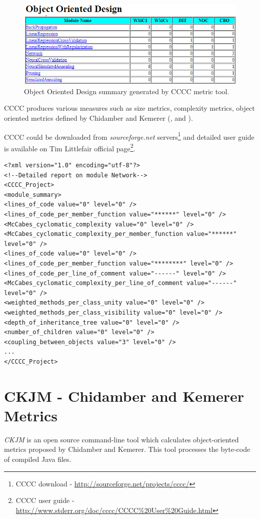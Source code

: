 \begin{figure}[h!]
	\centering
	\includegraphics[scale=0.6]{img/cccc2.png} 
	\caption{Object Oriented Design summary generated by CCCC metric tool.}		
	\label{fig:cccc2}
\end{figure}

CCCC produces various measures such as size metrics, complexity metrics, object oriented metrics defined by Chidamber and Kemerer (\cite{indie}, \cite{vaxjo} and \cite{cccc1}).

CCCC could be downloaded from \textit{sourceforge.net} servers\footnote{CCCC download - \url{http://sourceforge.net/projects/cccc/}} and detailed user guide is available on Tim Littlefair official page\footnote{CCCC user guide - \url{http://www.stderr.org/doc/cccc/CCCC\%20User\%20Guide.html}}.

\begin{lstlisting}[caption=XML representation of results generated by CCCC metric tool, label=ccccXml]
<?xml version="1.0" encoding="utf-8"?>
<!--Detailed report on module Network-->
<CCCC_Project>
<module_summary>
<lines_of_code value="0" level="0" />
<lines_of_code_per_member_function value="******" level="0" />
<McCabes_cyclomatic_complexity value="0" level="0" />
<McCabes_cyclomatic_complexity_per_member_function value="******" level="0" />
<lines_of_code value="0" level="0" />
<lines_of_code_per_member_function value="********" level="0" />
<lines_of_code_per_line_of_comment value="------" level="0" />
<McCabes_cyclomatic_complexity_per_line_of_comment value="------" level="0" />
<weighted_methods_per_class_unity value="0" level="0" />
<weighted_methods_per_class_visibility value="0" level="0" />
<depth_of_inheritance_tree value="0" level="0" />
<number_of_children value="0" level="0" />
<coupling_between_objects value="3" level="0" />
...
</CCCC_Project>
\end{lstlisting}

\section{CKJM - Chidamber and Kemerer Metrics}
\textit{CKJM} is an open source command-line tool which calculates object-oriented metrics proposed by Chidamber and Kemerer. This tool processes the byte-code of compiled Java files. 

